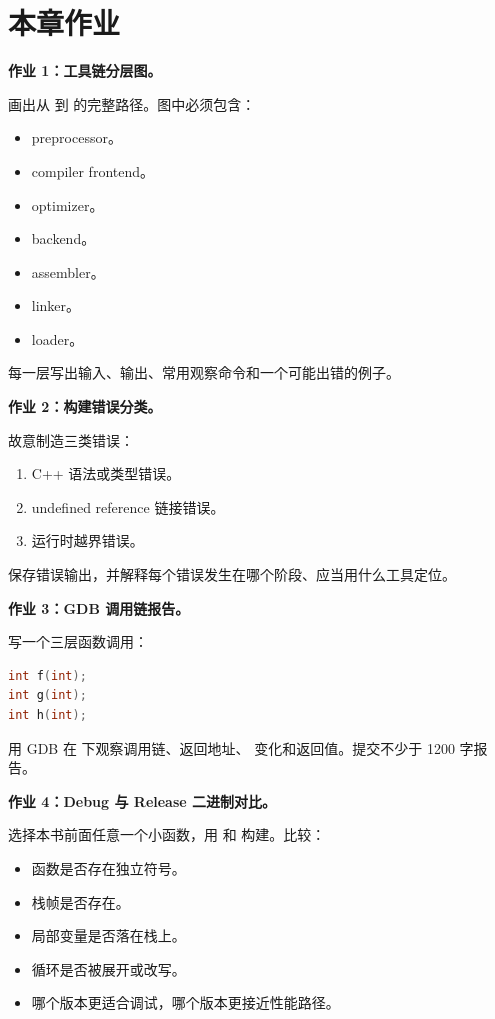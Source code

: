 \section{本章作业}

\begin{exercisebox}
\textbf{作业 1：工具链分层图。}

画出从  到  的完整路径。图中必须包含：

\begin{itemize}
  \item preprocessor。
  \item compiler frontend。
  \item optimizer。
  \item backend。
  \item assembler。
  \item linker。
  \item loader。
\end{itemize}

每一层写出输入、输出、常用观察命令和一个可能出错的例子。

\textbf{作业 2：构建错误分类。}

故意制造三类错误：

\begin{enumerate}
  \item C++ 语法或类型错误。
  \item undefined reference 链接错误。
  \item 运行时越界错误。
\end{enumerate}

保存错误输出，并解释每个错误发生在哪个阶段、应当用什么工具定位。

\textbf{作业 3：GDB 调用链报告。}

写一个三层函数调用：

\begin{lstlisting}[language=C++]
int f(int);
int g(int);
int h(int);
\end{lstlisting}

用 GDB 在  下观察调用链、返回地址、 变化和返回值。提交不少于 1200 字报告。

\textbf{作业 4：Debug 与 Release 二进制对比。}

选择本书前面任意一个小函数，用  和  构建。比较：

\begin{itemize}
  \item 函数是否存在独立符号。
  \item 栈帧是否存在。
  \item 局部变量是否落在栈上。
  \item 循环是否被展开或改写。
  \item 哪个版本更适合调试，哪个版本更接近性能路径。
\end{itemize}


\end{exercisebox}
